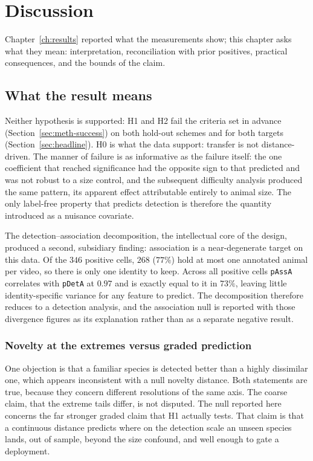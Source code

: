 \chapter{Discussion}
\label{ch:discussion}

Chapter~\ref{ch:results} reported what the measurements show; this chapter asks what they mean:
interpretation, reconciliation with prior positives, practical consequences, and the bounds of the claim.

\section{What the result means}
\label{sec:disc-meaning}
Neither hypothesis is supported: H1 and H2 fail the criteria set in advance
(Section~\ref{sec:meth-success}) on both hold-out schemes and for both targets
(Section~\ref{sec:headline}). H0 is what the data support:
transfer is not distance-driven. The manner of failure is as informative as the failure itself: the one
coefficient that reached significance had the opposite sign to that predicted and was not robust to a size
control, and the subsequent difficulty analysis produced the same pattern, its apparent effect attributable
entirely to animal size. The only label-free property that predicts detection is therefore the quantity
introduced as a nuisance covariate.

The detection--association decomposition, the intellectual core of the design, produced a second, subsidiary
finding: association is a near-degenerate target on this data. Of the $346$ positive cells, $268$ ($77\%$)
hold at most one annotated animal per video, so there is only one identity to keep. Across all positive cells
\texttt{pAssA} correlates with \texttt{pDetA} at $0.97$ and is exactly equal to it in $73\%$, leaving little
identity-specific variance for any feature to predict. The decomposition therefore reduces to a detection
analysis, and the association null is reported with those divergence figures as its explanation rather than
as a separate negative result.

\subsection{Novelty at the extremes versus graded prediction}
\label{sec:disc-coarse}
One objection is that a familiar species is detected better than a highly dissimilar one, which appears
inconsistent with a null novelty distance. Both statements are true, because they concern different
resolutions of the same axis. The coarse claim, that the extreme tails differ, is not disputed. The null
reported here concerns the far stronger graded claim that H1 actually tests. That claim is that a continuous
distance predicts where on the detection scale an unseen species lands, out of sample, beyond the size
confound, and well enough to gate a deployment.

